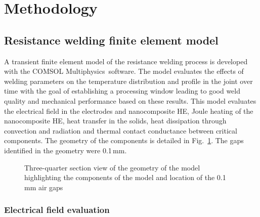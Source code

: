 \section{Methodology}

\subsection{Resistance welding finite element model}

A transient finite element model of the resistance welding process is developed with the COMSOL Multiphysics\textregistered \ software. 
The model evaluates the effects of welding parameters on the temperature distribution and profile in the joint over time with the goal of establishing a processing window leading to good weld quality and mechanical performance based on these results. 
This model evaluates the electrical field in the electrodes and nanocomposite HE, Joule heating of the nanocomposite HE, heat transfer in the solids, heat dissipation through convection and radiation and thermal contact conductance between critical components. 
The geometry of the components is detailed in Fig.~\ref{fig:2_Fig2}. 
The gaps identified in the geometry were \mbox{0.1\,mm}.

\begin{figure}[h!]
	\centering
	\resizebox{0.9\textwidth}{!}{
	}
	\caption{Three-quarter section view of the geometry of the model highlighting the components of the model and location of the 0.1 mm air gaps \cite{Brassard2019b}}
	\label{fig:2_Fig2}
\end{figure} 

\FloatBarrier
\subsubsection{Electrical field evaluation}

